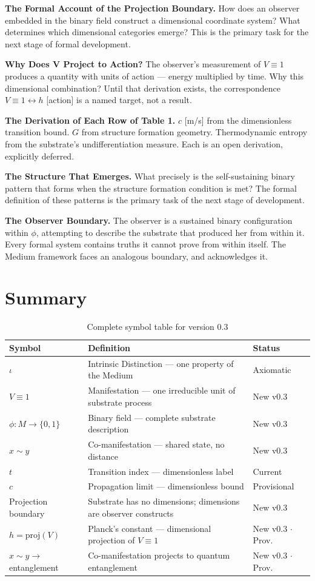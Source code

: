 \documentclass[11pt,letterpaper]{article}
\begin{document}
\textbf{The Formal Account of the Projection Boundary.} How does an observer embedded in the binary field construct a dimensional coordinate system? What determines which dimensional categories emerge? This is the primary task for the next stage of formal development.

\textbf{Why Does V Project to Action?} The observer's measurement of \(V \equiv 1\) produces a quantity with units of action --- energy multiplied by time. Why this dimensional combination? Until that derivation exists, the correspondence \(V \equiv 1 \leftrightarrow h\) {[}action] is a named target, not a result.

\textbf{The Derivation of Each Row of Table 1.} \(c\) {[}m/s] from the dimensionless transition bound. \(G\) from structure formation geometry. Thermodynamic entropy from the substrate's undifferentiation measure. Each is an open derivation, explicitly deferred.

\textbf{The Structure That Emerges.} What precisely is the self-sustaining binary pattern that forms when the structure formation condition is met? The formal definition of these patterns is the primary task of the next stage of development.

\textbf{The Observer Boundary.} The observer is a sustained binary configuration within \(\phi\), attempting to describe the substrate that produced her from within it. Every formal system contains truths it cannot prove from within itself. The Medium framework faces an analogous boundary, and acknowledges it.
\section{Summary}
\label{sec:org78dfbd9}

\begin{table}[htbp]
\caption{Complete symbol table for version 0.3}
\centering
\begin{tabular}{llp{3cm}}
\toprule
\textbf{Symbol} & \textbf{Definition} & \textbf{Status}\\
\midrule
\(\iota\) & Intrinsic Distinction --- one property of the Medium & Axiomatic\\
\(V \equiv 1\) & Manifestation --- one irreducible unit of substrate process & New v0.3\\
\(\phi : M \to \{0,1\}\) & Binary field --- complete substrate description & New v0.3\\
\(x \sim y\) & Co-manifestation --- shared state, no distance & New v0.3\\
\(t\) & Transition index --- dimensionless label & Current\\
\(c\) & Propagation limit --- dimensionless bound & Provisional\\
Projection boundary & Substrate has no dimensions; dimensions are observer constructs & New v0.3\\
\(h = \mathrm{proj}(V)\) & Planck's constant --- dimensional projection of \(V \equiv 1\) & New v0.3 \(\cdot\) Prov.\\
\(x \sim y \to\) entanglement & Co-manifestation projects to quantum entanglement & New v0.3 \(\cdot\) Prov.\\
\bottomrule
\end{tabular}
\end{table}
\end{document}
